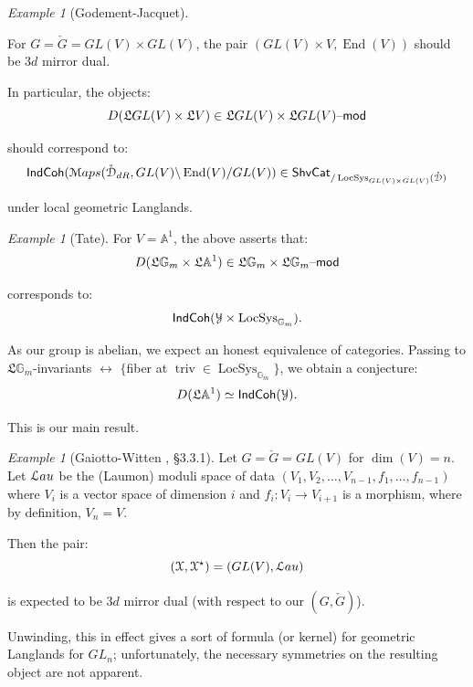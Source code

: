 \documentclass[reqno,11pt]{amsart}
\numberwithin{equation}{subsection}
\theoremstyle{remark}
\newtheorem{example}[thm]{Example}
\newcommand{\bA}{{\mathbb A}}
\newcommand{\bG}{{\mathbb G}}
\newcommand{\sD}{{\EuScript D}}
\newcommand{\sL}{{\EuScript L}}
\newcommand{\sM}{{\EuScript M}}
\newcommand{\sX}{{\EuScript X}}
\newcommand{\sY}{{\EuScript Y}}
\newcommand{\fL}{{\mathfrak L}}
\newcommand{\on}{\operatorname}
\newcommand{\mathendash}{\text{\textendash}}
\newcommand{\End}{\on{End}}
\newcommand{\LocSys}{\on{LocSys}}
\renewcommand{\mod}{\mathendash\mathsf{mod}}
\newcommand{\ShvCat}{\mathsf{ShvCat}}
\newcommand{\IndCoh}{\mathsf{IndCoh}}
\newcommand{\Maps}{\sM aps}
\renewcommand{\o}[1]{\mathring{#1}}
\begin{document}
\begin{example}[Godement-Jacquet]\label{e:godement-jacquet}

For $G = \check{G} = GL(V) \times GL(V)$, the pair
$(GL(V) \times V,\End(V))$ should be $3d$ mirror dual.

In particular, the objects:
%
\[
D(\fL GL(V) \times \fL V) \in \fL GL(V) \times \fL GL(V) \mod 
\]

\noindent should correspond to:
%
\[
\IndCoh(\Maps(\o{\sD}_{dR},GL(V) \backslash\End(V)/GL(V)) \in 
\ShvCat_{/\LocSys_{GL(V)\times GL(V)}(\o{\sD})}
\]

\noindent under local geometric Langlands. 

\end{example}

\begin{example}[Tate]

For $V = \bA^1$, 
the above asserts that:
%
\[
D(\fL\bG_m \times \fL \bA^1) \in \fL \bG_m \times \fL \bG_m \mod 
\]

\noindent corresponds to:
%
\[
\IndCoh(\sY \times \LocSys_{\bG_m}).
\]

\noindent As our group is abelian, we expect an honest equivalence 
of categories. Passing to $\fL\bG_m$-invariants $\leftrightarrow$ 
$\{$fiber at $\on{triv} \in \LocSys_{\bG_m}\}$, we obtain a conjecture:
%
\[
D(\fL \bA^1) \simeq \IndCoh(\sY).
\]

\noindent This is our main result.  

\end{example}

\begin{example}[Gaiotto-Witten \cite{gaiotto-witten}, \S 3.3.1]

Let $G = \check{G} = GL(V)$ for $\dim(V) = n$. 
Let ${\sL au}$ be the (Laumon) moduli space
of data $(V_1,V_2,\ldots,V_{n-1},f_1,\ldots,f_{n-1})$ where
$V_i$ is a vector space of dimension $i$ and $f_i:V_i \to V_{i+1}$ is a 
morphism, where by definition, $V_n = V$.

Then the pair:
%
\[
(\sX,\sX^{\star}) = (GL(V),{\sL au})
\] 

\noindent is expected to be $3d$ mirror dual (with respect to our $(G,\check{G})$).

Unwinding, this in effect gives a sort of formula (or kernel) for 
geometric Langlands for $GL_n$; unfortunately, the necessary symmetries on the
resulting object are not apparent.  

\end{example}
\end{document}
